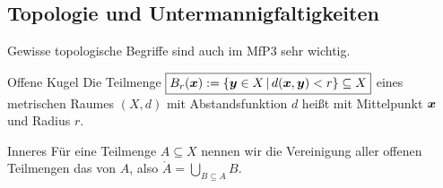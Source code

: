 \subsection{Topologie und Untermannigfaltigkeiten}\label{ssec:Topologie}
Gewisse topologische Begriffe sind auch im MfP3 sehr wichtig.
\begin{Def}
{Offene Kugel}
Die Teilmenge $\boxed{B_r({{\text{\boldmath${x}$}}}):=\left\{{{\text{\boldmath${y}$}}}\in X\,|\, d({{\text{\boldmath${x}$}}},{{\text{\boldmath${y}$}}})<r\right\}\subseteq X}$ eines metrischen Raumes $(X,d)$ mit Abstandsfunktion $d$ heißt  mit Mittelpunkt ${{\text{\boldmath${x}$}}}$ und Radius $r$.
\end{Def}
\begin{Def}
{Inneres}
Für eine Teilmenge $A\subseteq X$ nennen wir die Vereinigung aller offenen Teilmengen das  von $A$, also $\mathring{A}=\bigcup_{B\subseteq A}B$.
\end{Def}

